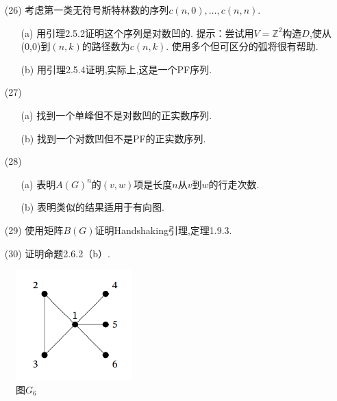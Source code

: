 \documentclass{ctexbook}
\begin{document}
\begin{enumerate}
	\item[(26)]考虑第一类无符号斯特林数的序列$c(n,0),\dots,c(n,n)$.
	\begin{enumerate}
		\item[(a)]用引理2.5.2证明这个序列是对数凹的. 提示：尝试用$V={\mathbb{Z}}^2$构造$D$,使从(0,0)到$(n,k)$的路径数为$c(n,k)$. 使用多个但可区分的弧将很有帮助. 
		\item[(b)] 用引理2.5.4证明,实际上,这是一个PF序列. 
	\end{enumerate}
\end{enumerate}

\begin{enumerate}
	\item[(27)]
	\begin{enumerate}
		\item[(a)]找到一个单峰但不是对数凹的正实数序列. 
		\item[(b)] 找到一个对数凹但不是PF的正实数序列. 
	\end{enumerate}
\end{enumerate}

\begin{enumerate}
	\item[(28)]
	\begin{enumerate}
		\item[(a)]表明$A{(G)}^n$的$(v,w)$项是长度$n$从$v$到$w$的行走次数. 
		\item[(b)] 表明类似的结果适用于有向图. 
	\end{enumerate}
\end{enumerate}


\begin{enumerate}
	\item[(29)]使用矩阵$B(G)$证明Handshaking引理,定理1.9.3. 
\end{enumerate}


\begin{enumerate}
	\item[(30)]证明命题2.6.2（b）. 
\end{enumerate}
\begin{figure}[htbp]
	\centering
	\includegraphics*[width=0.4\textwidth]{./fig2/10.png}
	\caption{图$G_6$}
\end{figure}
\end{document}
